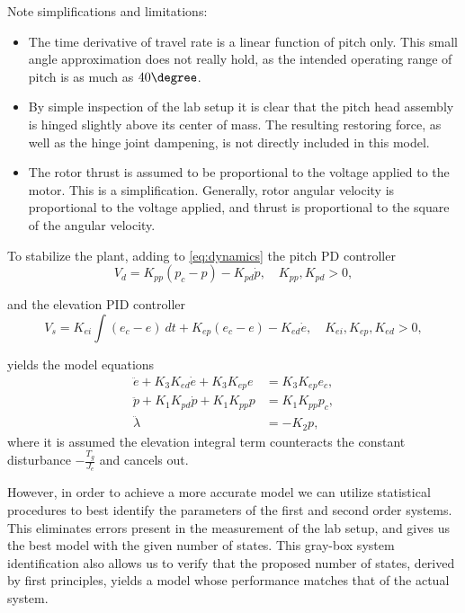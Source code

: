 Note simplifications and limitations:
\begin{itemize}
	\item{The time derivative of travel rate is a linear function of pitch only. This small angle approximation does not really hold, as the intended operating range of pitch is as much as $40\degree$.}
	\item{By simple inspection of the lab setup it is clear that the pitch head assembly is hinged slightly above its center of mass. The resulting restoring force, as well as the hinge joint dampening, is not directly included in this model.}
	\item{The rotor thrust is assumed to be proportional to the voltage applied to the motor. This is a simplification. Generally, rotor angular velocity is proportional to the voltage applied, and thrust is proportional to the square of the angular velocity.}
\end{itemize}

To stabilize the plant, adding to \eqref{eq:dynamics} the pitch PD controller
\begin{equation*}
	V_d = K_{pp} (p_c - p) - K_{pd} \dot{p}, \quad K_{pp}, K_{pd} > 0,
\end{equation*}

and the elevation PID controller
\begin{equation*}
	V_s = K_{ei} \int (e_c - e) \ dt +  K_{ep} (e_c - e) - K_{ed} \dot{e}, \quad K_{ei}, K_{ep}, K_{ed} > 0,
\end{equation*}

yields the model equations
\begin{subequations}
\label{eq:model}
\begin{align}
	\ddot{e} + K_{3} K_{ed} \dot{e} + K_{3} K_{ep} e &= K_{3} K_{ep} e_{c}, \label{eq:model_se_al_elev} \\
	\ddot{p} + K_{1} K_{pd} \dot{p} + K_{1} K_{pp} p &= K_{1} K_{pp} p_{c}, \label{eq:model_se_al_pitch} \\
	\ddot{\lambda} &= -K_{2} p, \label{eq:model_se_al_r} 
\end{align}
\end{subequations}
where it is assumed the elevation integral term counteracts the constant disturbance $-\frac{T_g}{J_e}$ and cancels out.

However, in order to achieve a more accurate model we can utilize statistical procedures to best identify the parameters of the first and second order systems. This eliminates errors present in the measurement of the lab setup, and gives us the best model with the given number of states. This gray-box system identification also allows us to verify that the proposed number of states, derived by first principles, yields a model whose performance matches that of the actual system.

